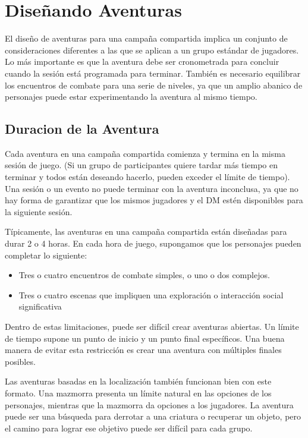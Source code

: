 \documentclass[a4paper,twocolumn,openany,10pt]{dndbook}
\begin{document}
\section*{Diseñando Aventuras}

El diseño de aventuras para una campaña compartida implica un conjunto de consideraciones diferentes a las que se aplican a un
grupo estándar de jugadores. Lo más importante es que la aventura debe ser cronometrada para concluir cuando la sesión está
programada para terminar. También es necesario equilibrar los encuentros de combate para una serie de niveles, ya que un amplio
abanico de personajes puede estar experimentando la aventura al mismo tiempo. 

\subsection*{Duracion de la Aventura}
Cada aventura en una campaña compartida comienza y termina en la misma sesión de juego. (Si un grupo de participantes quiere
tardar más tiempo en terminar y todos están deseando hacerlo, pueden exceder el límite de tiempo). Una sesión o un evento no
puede terminar con la aventura inconclusa, ya que no hay forma de garantizar que los mismos jugadores y el DM estén disponibles
para la siguiente sesión.

Típicamente, las aventuras en una campaña compartida están diseñadas para durar 2 o 4 horas. En cada hora de juego, supongamos
que los personajes pueden completar lo siguiente:

\begin{itemize}
	\item Tres o cuatro encuentros de combate simples, o uno o dos complejos.
	\item Tres o cuatro escenas que impliquen una exploración o interacción social significativa
\end{itemize}

Dentro de estas limitaciones, puede ser difícil crear aventuras abiertas. Un límite de tiempo supone un punto de inicio y un
punto final específicos. Una buena manera de evitar esta restricción es crear una aventura con múltiples finales posibles.

Las aventuras basadas en la localización también funcionan bien con este formato. Una mazmorra presenta un límite natural en las
opciones de los personajes, mientras que la mazmorra da opciones a los jugadores. La aventura puede ser una búsqueda para
derrotar a una criatura o recuperar un objeto, pero el camino para lograr ese objetivo puede ser difícil para cada grupo.
\end{document}
